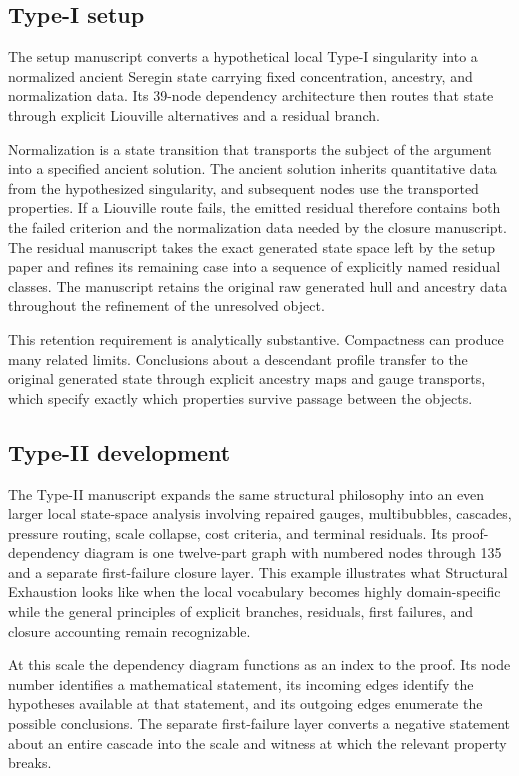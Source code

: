 \documentclass[11pt]{article}
\begin{document}
\subsection{Type-I setup}
The setup manuscript converts a hypothetical local Type-I singularity into a normalized ancient Seregin state carrying fixed concentration, ancestry, and normalization data.
Its 39-node dependency architecture then routes that state through explicit Liouville alternatives and a residual branch.

Normalization is a state transition that transports the subject of the
argument into a specified ancient solution. The ancient solution inherits
quantitative data from the hypothesized singularity, and subsequent nodes use
the transported properties.
If a Liouville route fails, the emitted residual therefore contains both the
failed criterion and the normalization data needed by the closure manuscript.
The residual manuscript takes the exact generated state space left by the setup paper and refines its remaining case into a sequence of explicitly named residual classes.
The manuscript retains the original raw generated hull and ancestry data throughout the refinement of the unresolved object.

This retention requirement is analytically substantive. Compactness can
produce many related limits. Conclusions about a descendant profile transfer
to the original generated state through explicit ancestry maps and gauge
transports, which specify exactly which properties survive passage between
the objects.
\subsection{Type-II development}
The Type-II manuscript expands the same structural philosophy into an even larger local state-space analysis involving repaired gauges, multibubbles, cascades, pressure routing, scale collapse, cost criteria, and terminal residuals.
Its proof-dependency diagram is one twelve-part graph with numbered nodes through 135 and a separate first-failure closure layer.
This example illustrates what Structural Exhaustion looks like when the local vocabulary becomes highly domain-specific while the general principles of explicit branches, residuals, first failures, and closure accounting remain recognizable.

At this scale the dependency diagram functions as an index to the proof. Its
node number identifies a mathematical statement, its incoming edges identify
the hypotheses available at that statement, and its outgoing edges enumerate
the possible conclusions. The separate first-failure layer converts a
negative statement about an entire cascade into the scale and witness at
which the relevant property breaks.
\end{document}
